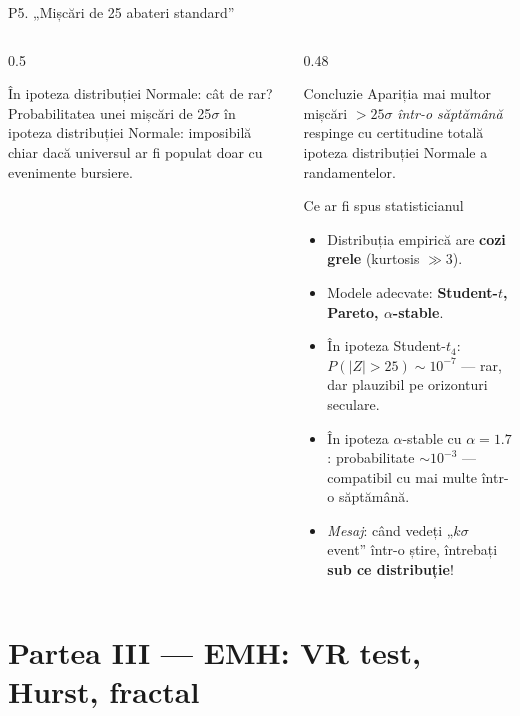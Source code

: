 \documentclass[9pt, aspectratio=169, t]{beamer}
\begin{document}
\begin{frame}[shrink=35]{P5. „Mișcări de 25 abateri standard''}
\begin{columns}[T]
\begin{column}{0.5\textwidth}
\begin{block}{În ipoteza distribuției Normale: cât de rar?}
Probabilitatea unei mișcări de 25$\sigma$ în ipoteza distribuției Normale: imposibilă chiar dacă universul ar fi populat doar cu evenimente bursiere.
\end{block}
\end{column}
\begin{column}{0.48\textwidth}
\begin{alertblock}{Concluzie}
Apariția mai multor mișcări $>25\sigma$ \emph{într-o săptămână} respinge cu certitudine totală ipoteza distribuției Normale a randamentelor.
\end{alertblock}
\begin{block}{Ce ar fi spus statisticianul}
\begin{itemize}\setlength{\itemsep}{1pt}
    \item Distribuția empirică are \textbf{cozi grele} (kurtosis $\gg 3$).
    \item Modele adecvate: \textbf{Student-$t$, Pareto, $\alpha$-stable}.
    \item În ipoteza Student-$t_4$: $P(|Z|>25)\sim 10^{-7}$ --- rar, dar plauzibil pe orizonturi seculare.
    \item În ipoteza $\alpha$-stable cu $\alpha=1.7$: probabilitate $\sim 10^{-3}$ --- compatibil cu mai multe într-o săptămână.
    \item \emph{Mesaj}: când vedeți „$k\sigma$ event'' într-o știre, întrebați \textbf{sub ce distribuție}!
\end{itemize}
\end{block}
\end{column}
\end{columns}
\end{frame}

\section{Partea III --- EMH: VR test, Hurst, fractal}
\end{document}
